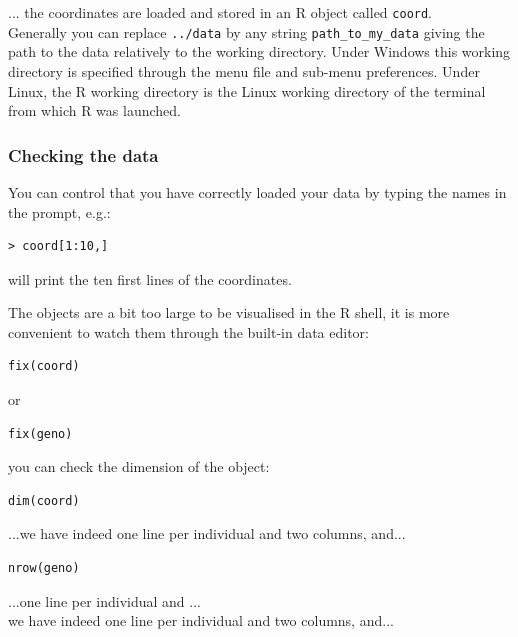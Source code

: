 \documentclass{article}
\begin{document}
... the coordinates are loaded and stored in an R object called \texttt{coord}.\\


Generally you can replace {\tt ../data} by any string {\tt path\_to\_my\_data}  
giving the path  to the data relatively to the working directory. 
Under Windows this working directory is  specified through the menu file and sub-menu preferences. 
Under  Linux, the R working directory is the Linux working directory of the terminal  from which R was launched. 


\subsubsection{Checking the data}
You can control that you have correctly loaded your data by typing the names in the prompt, e.g.:

\begin{verbatim}
> coord[1:10,]
\end{verbatim}



will print the ten first lines of the coordinates.

The objects are a bit too large to be visualised in the R shell, it is more convenient to watch them through the built-in data editor:

\begin{verbatim}
fix(coord)
\end{verbatim}



or 

\begin{verbatim}
fix(geno)
\end{verbatim}



you can check the dimension of the object:

\begin{verbatim}
dim(coord)
\end{verbatim}



...we have indeed one line per individual and two columns, and...

\begin{verbatim}
nrow(geno)
\end{verbatim}



...one line per individual and ...\\

we have indeed one line per individual and two columns, and...
\end{document}
